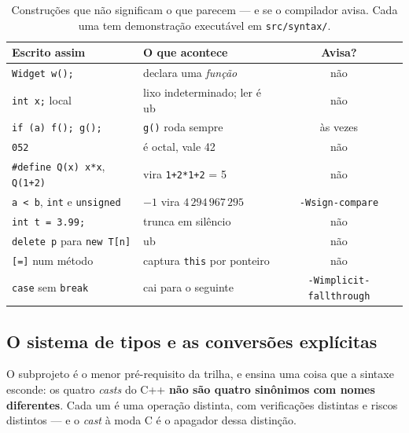 \begin{table}[htbp]
\centering
\caption{Construções que não significam o que parecem --- e se o compilador
         avisa. Cada uma tem demonstração executável em \texttt{src/syntax/}.}
\label{tab:armadilhas-syntax}
\footnotesize
\begin{tabular}{@{}llc@{}}
\toprule
\textbf{Escrito assim} & \textbf{O que acontece} & \textbf{Avisa?} \\
\midrule
\texttt{Widget w();}                  & declara uma \emph{função}          & não \\
\texttt{int x;} local                 & lixo indeterminado; ler é \gls{ub} & não \\
\texttt{if (a) f(); g();}             & \texttt{g()} roda sempre           & às vezes \\
\texttt{052}                          & é octal, vale 42                   & não \\
\texttt{\#define Q(x) x*x}, \texttt{Q(1+2)} & vira \texttt{1+2*1+2} = 5    & não \\
\texttt{a < b}, \texttt{int} e \texttt{unsigned} & $-1$ vira $4\,294\,967\,295$ & \texttt{-Wsign-compare} \\
\texttt{int t = 3.99;}                & trunca em silêncio                 & não \\
\texttt{delete p} para \texttt{new T[n]} & \gls{ub}                        & não \\
\texttt{[=]} num método               & captura \texttt{this} por ponteiro & não \\
\texttt{case} sem \texttt{break}      & cai para o seguinte                & \texttt{-Wimplicit-fallthrough} \\
\bottomrule
\end{tabular}
\end{table}

\subsection{O sistema de tipos e as conversões explícitas}
\label{sec:casts}

O subprojeto  é o menor pré-requisito da trilha, e ensina uma
coisa que a sintaxe esconde: os quatro \emph{casts} do C++ \textbf{não são
quatro sinônimos com nomes diferentes}. Cada um é uma operação distinta, com
verificações distintas e riscos distintos --- e o \emph{cast} à moda C é o
apagador dessa distinção.


